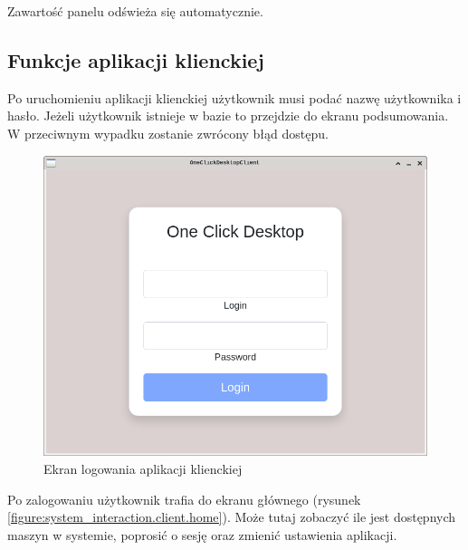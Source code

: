 \documentclass[../opis-rozwiazania.tex]{subfiles}
\begin{document}
Zawartość panelu odświeża się automatycznie.

\newpage
\subsection{Funkcje aplikacji klienckiej}

Po uruchomieniu aplikacji klienckiej użytkownik musi podać nazwę użytkownika i hasło.
Jeżeli użytkownik istnieje w bazie to przejdzie do ekranu podsumowania.
W przeciwnym wypadku zostanie zwrócony błąd dostępu.

\begin{figure}[H]
	\centering
	\includegraphics[width=\textwidth]{resources/client_login.png}
	\caption{Ekran logowania aplikacji klienckiej}
	\label{figure:system_interaction.client.login}
\end{figure}

Po zalogowaniu użytkownik trafia do ekranu głównego (rysunek \ref{figure:system_interaction.client.home}).
Może tutaj zobaczyć ile jest dostępnych maszyn w systemie, poprosić o sesję oraz zmienić ustawienia aplikacji.
\end{document}
